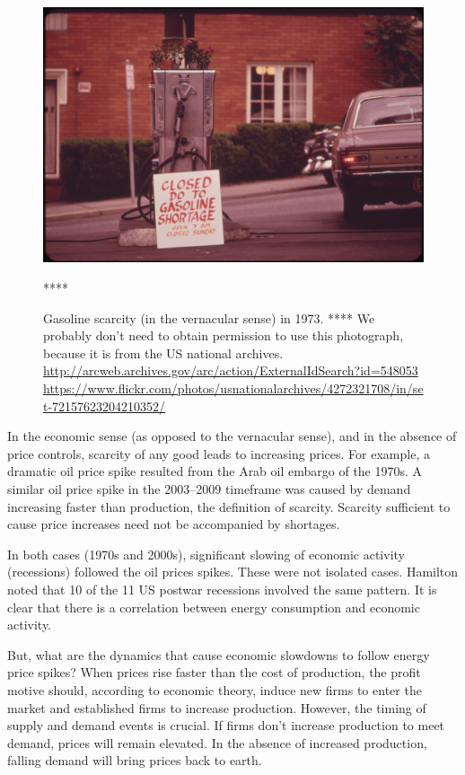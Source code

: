 \begin{figure}[!ht]
\centering\
\includegraphics[width=\linewidth]{Part_0/Chapter_Introduction/images/gas_shortage_1973.jpg}
\caption[Gasoline shortage]{Gasoline scarcity (in the vernacular sense) in 1973.
**** We probably don't need to obtain permission to use this photograph, because
it is from the US national archives.
\url{http://arcweb.archives.gov/arc/action/ExternalIdSearch?id=548053}
\url{https://www.flickr.com/photos/usnationalarchives/4272321708/in/set-72157623204210352/}}
****
\label{fig:gas_shortage}
\end{figure}

In the economic sense (as opposed to the vernacular sense), 
and in the absence of price controls, 
scarcity of any good leads to increasing prices.
For example, a dramatic oil price spike resulted from
the Arab oil embargo of the 1970s.
A similar oil price spike in the 2003--2009 timeframe
was caused by demand increasing faster than production, the definition of scarcity.
Scarcity sufficient to cause price increases need not be accompanied
by shortages.

In both cases (1970s and 2000s), 
significant slowing of economic activity (recessions)
followed the oil prices spikes.
These were not isolated cases.
Hamilton noted that 
10 of the 11 US postwar recessions 
involved the same pattern.\cite[p.~45]{Hamilton:2013vc}
It is clear that 
there is a correlation between energy consumption and economic activity.

But, what are the dynamics that cause economic slowdowns 
to follow energy price spikes?
When prices rise faster than the cost of production, 
the profit motive should, according to economic theory, induce 
new firms to enter the market and
established firms to increase production.
However, the timing of supply and demand events is crucial.
If firms don't increase production to meet demand, 
prices will remain elevated.
In the absence of increased production, falling demand will 
bring prices back to earth.


